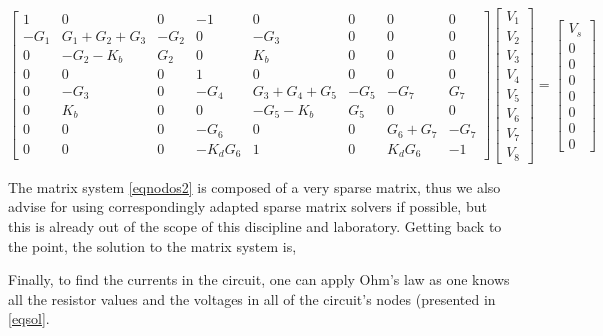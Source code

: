 \begin{equation}
    \begin{bmatrix}
     1 &  0      &  0 &    -1  &     0      &  0  &  0    &  0\\
     -G_1 & G_1+G_2+G_3 & -G_2  & 0   &  -G_3       &  0  &  0    &  0\\
     0   & -G_2-K_b    & G_2  & 0   &   K_b       &  0  &  0    &  0\\
     0   & 0        & 0   & 1 & 0       &  0  & 0   & 0\\
     0   & -G_3      &  0 &  -G_4  &   G_3+G_4+G_5 & -G_5 &  -G_7    & G_7\\
     0   & K_b       & 0  &  0    & -G_5-K_b     & G_5  & 0     & 0\\
     0   & 0        & 0  & -G_6   &  0         & 0   & G_6+G_7 & -G_7\\
     0   & 0        & 0  &  -K_dG_6    &  1         & 0   & K_dG_6     & -1
    \end{bmatrix} 
    \begin{bmatrix}
        V_1\\
        V_2\\
        V_3\\
        V_4\\
        V_5\\
        V_6\\
        V_7\\
        V_8
    \end{bmatrix}
    = 
    \begin{bmatrix}
        V_s\\
        0\\
        0\\
        0\\
        0\\
        0\\
        0\\
        0
    \end{bmatrix}
\label{eqnodos2}
\end{equation}

The matrix system \ref{eqnodos2} is composed of a very sparse matrix, thus we also advise for using correspondingly adapted sparse matrix solvers if possible, but this is already out of the scope of this discipline and laboratory. Getting back to the point, the solution to the matrix system is,

%

Finally, to find the currents in the circuit, one can apply Ohm's law as one knows all the resistor values and the voltages in all of the circuit's nodes (presented in \eqref{eqsol}. \\

